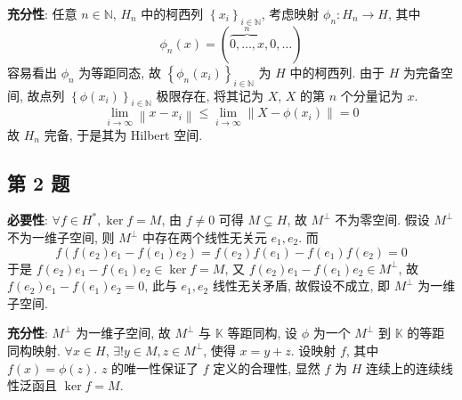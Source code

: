 \documentclass[../main.tex]{subfiles}
\begin{document}
\noindent \textbf{充分性}:
任意 $n \in \mathbb{N}$, $H_n$ 中的柯西列 $\left\{ x_i \right\}_{i \in \mathbb{N}}$,
考虑映射 $\phi_n : H_n \to H$, 其中
\[
    \phi_n \left( x \right)
    = ( \overbrace{0, \dots, x}^n, 0, \dots )
\]
容易看出 $\phi_n$ 为等距同态,
故 $\left\{ \phi_n \left( x_i \right) \right\}_{i \in \mathbb{N}}$ 为 $H$ 中的柯西列.
由于 $H$ 为完备空间, 故点列 $\left\{ \phi \left( x_i \right) \right\}_{i \in \mathbb{N}}$ 极限存在,
将其记为 $X$, $X$ 的第 $n$ 个分量记为 $x$.
\[
    \lim_{i \to \infty} \left\| x - x_i \right\|
    \leqslant \lim_{i \to \infty} \left\| X - \phi \left( x_i \right) \right\|
    = 0
\]
故 $H_n$ 完备, 于是其为 Hilbert 空间.

\subsection{第 2 题}
\noindent \textbf{必要性}:
$\forall f \in H^*, \ker f = M$, 由 $f \neq 0$ 可得 $M \subsetneq H$, 故 $M^\bot$ 不为零空间.
假设 $M^\bot$ 不为一维子空间, 则 $M^\bot$ 中存在两个线性无关元 $e_1, e_2$.
而
\[
    f\left( f \left( e_2 \right) e_1 - f \left( e_1 \right) e_2 \right)
    = f \left( e_2 \right) f \left( e_1 \right) - f \left( e_1 \right) f \left( e_2 \right)
    = 0
\]
于是 $f \left( e_2 \right) e_1 - f \left( e_1 \right) e_2 \in \ker f = M$, 又 $f \left( e_2 \right) e_1 - f \left( e_1 \right) e_2 \in M^\bot$,
故 $f \left( e_2 \right) e_1 - f \left( e_1 \right) e_2 = 0$, 此与 $e_1, e_2$ 线性无关矛盾,
故假设不成立, 即 $M^\bot$ 为一维子空间.

\noindent \textbf{充分性}:
$M^\bot$ 为一维子空间, 故 $M^\bot$ 与 $\mathbb{K}$ 等距同构, 设 $\phi$ 为一个 $M^\bot$ 到 $\mathbb{K}$ 的等距同构映射.
$\forall x \in H$, $\exists! y \in M, z \in M^\bot$, 使得 $x = y + z$.
设映射 $f$, 其中 $f \left( x \right) = \phi \left( z \right)$.
$z$ 的唯一性保证了 $f$ 定义的合理性, 显然 $f$ 为 $H$ 连续上的连续线性泛函且 $\ker f = M$.
\end{document}
